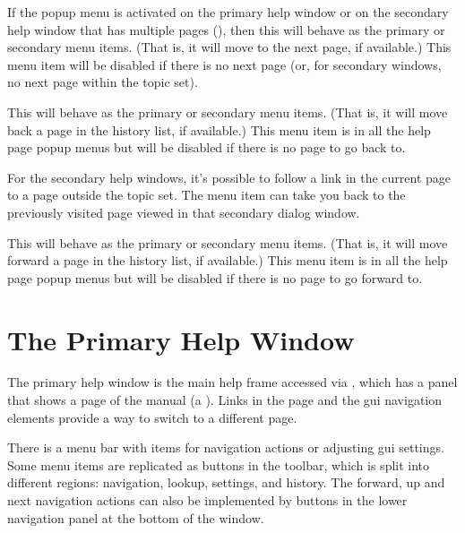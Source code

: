 
If the popup menu is activated on the primary help window or on the
secondary help window that has multiple pages
(), then this will behave
as the primary  or
secondary  menu items.
(That is, it will move to the next page, if available.)
This menu item will be disabled if there is no next page (or, for secondary
windows, no next page within the topic set).


This will behave as the primary
 or secondary
 menu items.
(That is, it will move back a page in the history list, if available.)
This menu item is in all the help page popup menus but will be
disabled if there is no page to go back to.

For the secondary help windows, it's possible to follow a link in
the current page to a page outside the topic set. The menu item can
take you back to the previously visited page viewed in that
secondary dialog window.


This will behave as the primary
 or secondary
 menu items.
(That is, it will move forward a page in the history list, if available.)
This menu item is in all the help page popup menus but will be
disabled if there is no page to go forward to.

\section{The Primary Help Window}
\label{sec:primaryhelp}

The primary help window is the main help frame accessed via
, which has a panel that shows a page of the
manual (a ). Links in the page and the \gls{gui}
navigation elements provide a way to switch to a different page.

There is a menu bar with items for navigation actions or adjusting
\gls{gui} settings. Some menu items are replicated as buttons in the
toolbar, which is split into different regions: navigation, lookup,
settings, and history. The forward, up and next navigation actions
can also be implemented by buttons in the lower navigation panel at
the bottom of the window.

